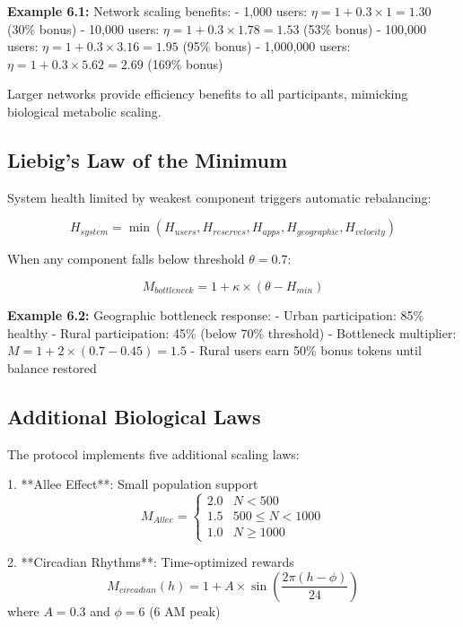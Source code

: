 \documentclass[11pt,letterpaper]{article}
\begin{document}
\textbf{Example 6.1:} Network scaling benefits:
- 1,000 users: $\eta = 1 + 0.3 \times 1 = 1.30$ (30\% bonus)
- 10,000 users: $\eta = 1 + 0.3 \times 1.78 = 1.53$ (53\% bonus)
- 100,000 users: $\eta = 1 + 0.3 \times 3.16 = 1.95$ (95\% bonus)
- 1,000,000 users: $\eta = 1 + 0.3 \times 5.62 = 2.69$ (169\% bonus)

Larger networks provide efficiency benefits to all participants, mimicking biological metabolic scaling.

\subsection{Liebig's Law of the Minimum}

System health limited by weakest component triggers automatic rebalancing:

\begin{equation}
H_{system} = \min(H_{users}, H_{reserves}, H_{apps}, H_{geographic}, H_{velocity})
\end{equation}

When any component falls below threshold $\theta = 0.7$:

\begin{equation}
M_{bottleneck} = 1 + \kappa \times \left(\theta - H_{min}\right)
\end{equation}

\textbf{Example 6.2:} Geographic bottleneck response:
- Urban participation: 85\% healthy
- Rural participation: 45\% (below 70\% threshold)
- Bottleneck multiplier: $M = 1 + 2 \times (0.7 - 0.45) = 1.5$
- Rural users earn 50\% bonus tokens until balance restored

\subsection{Additional Biological Laws}

The protocol implements five additional scaling laws:

1. **Allee Effect**: Small population support
   \begin{equation}
   M_{Allee} = \begin{cases}
   2.0 & N < 500 \\
   1.5 & 500 \leq N < 1000 \\
   1.0 & N \geq 1000
   \end{cases}
   \end{equation}

2. **Circadian Rhythms**: Time-optimized rewards
   \begin{equation}
   M_{circadian}(h) = 1 + A \times \sin\left(\frac{2\pi(h - \phi)}{24}\right)
   \end{equation}
   where $A = 0.3$ and $\phi = 6$ (6 AM peak)
\end{document}

